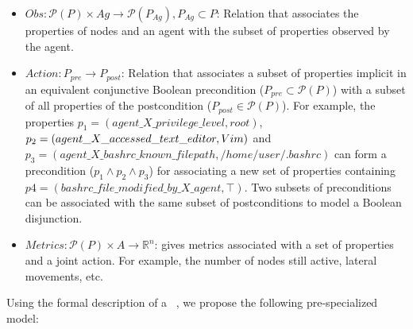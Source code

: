 \begin{itemize}
\item $Obs: \mathcal{P}(P) \times Ag \rightarrow \mathcal{P}(P_{Ag}), P_{Ag} \subset P$: Relation that associates the properties of nodes and an agent with the subset of properties observed by the agent.

\item $Action: P_{pre} \rightarrow P_{post}$: Relation that associates a subset of properties implicit in an equivalent conjunctive Boolean precondition ($P_{pre} \subset \mathcal{P}(P)$) with a subset of all properties of the postcondition ($P_{post} \in \mathcal{P} (P)$). For example, the properties $p_1 = (agent\_X\_privilege\_level, \allowbreak root)$, $p_2 = (agent\_X\_acce\-\allowbreak ssed\_text\_editor, \allowbreak Vim)$ and $p_3 = (agent\_X\_bashrc\_known\_filepath, /home/user/ .bashrc)$ can form a precondition ($p_1 \land p_2 \land p_3$) for associating a new set of properties containing $p4 = (bashrc\_file\_modified\_by\_X\_agent, \top)$. Two subsets of preconditions can be associated with the same subset of postconditions to model a Boolean disjunction.

\item $Metrics: \mathcal{P}(P) \times A \rightarrow \mathbb{R}^{n}$: gives metrics associated with a set of properties and a joint action. For example, the number of nodes still active, lateral movements, etc.

\end {itemize}


Using the formal description of a ~\cite{Oliehoek2016}, we propose the following pre-specialized  model:

